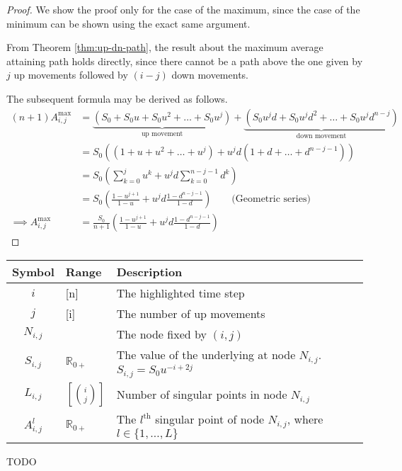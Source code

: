 \begin{proof}
	We show the proof only for the case of the maximum, since the case of the minimum can be shown using the exact same argument.
	
	From Theorem \ref{thm:up-dn-path}, the result about the maximum average attaining path holds directly, since there cannot be a path above the one given by $j$ up movements followed by $(i-j)$ down movements.
	
	The subsequent formula may be derived as follows.
	\begin{align*}
		(n+1) A_{i,j}^{\max} &= \underbrace{ ( S_0 + S_0 u + S_0 u^2 + \dots + S_0 u^j ) }_\textrm{up movement} + \underbrace{ ( S_0 u^j d + S_0 u^j d^2 + \dots + S_0 u^j d^{n-j} ) }_\textrm{down movement} \\
		&= S_0 ( (1 + u + u^2 + \dots + u^j ) + u^j d ( 1 + d + \dots + d^{n-j-1} ) ) \\
		&= S_0 \left( \sum_{k=0}^j u^k + u^j d \sum_{k=0}^{n-j-1} d^k \right) \\
		&= S_0 \left( \frac{1 - u^{j+1}}{1-u} + u^{j} d \frac{1 - d^{n-j-1}}{1-d} \right) \qquad \textrm{(Geometric series)} \\
		\implies A_{i,j}^{\max} &= \frac{S_0}{n+1} \left( \frac{1 - u^{j+1}}{1-u} + u^{j} d \frac{1 - d^{n-j-1}}{1-d} \right)
	\end{align*}
\end{proof}


\begin{tabular}{cll}
	\toprule
	Symbol & Range & Description \\
	\midrule
	$ i $ & [n] & The highlighted time step \\
	$ j $ & [i] & The number of up movements \\
	$ N_{i,j} $ & & The node fixed by $ (i,j) $ \\
	$ S_{i,j} $ & $ \mathbb{R}_{0+} $ & The value of the underlying at node $ N_{i,j} $. $ S_{i,j} = S_0 u^{-i+2j} $ \\
	$ L_{i,j} $ & $ \left[ \binom{i}{j} \right] $ & Number of singular points in node $ N_{i,j} $ \\
	$ A_{i,j}^l $ & $ \mathbb{R}_{0+} $ & The $ l^\mathrm{th} $ singular point of node $ N_{i,j} $, where $ l \in \{ 1, \dots, L \} $ \\
	
	\bottomrule
\end{tabular}



\begin{lmm}[Lemma 3]
	TODO
\end{lmm}


